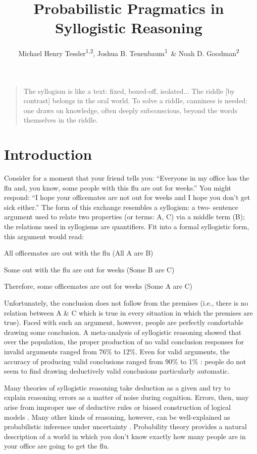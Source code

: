 \documentclass[floatsintext, man]{apa6}
\title{Probabilistic Pragmatics in Syllogistic Reasoning}
\author{Michael Henry Tessler\textsuperscript{1}\textsuperscript{,2}, Joshua B. Tenenbaum\textsuperscript{1}~\& Noah D. Goodman\textsuperscript{2}}
\date{}
\affiliation{
\vspace{0.5cm}
\textsuperscript{1} Department of Brain and Cognitive Sciences, Massachusetts Institute of Technology \\
\textsuperscript{2} Department of Psychology, Stanford University
}
\date{}
\newenvironment{aquote}[1]
{\savebox\mybox{#1}\begin{quote}} {\signed{\usebox\mybox}\end{quote}}
\begin{document}
\maketitle


\begin{aquote}{\textbf{Walter J. Ong}, \emph{Orality and Literacy} (1982)}The syllogism is like a text: fixed, boxed-off, isolated... The riddle [by contrast] belongs in the oral world. To solve a riddle, canniness is needed: one draws on knowledge, often deeply subconscious, beyond the words themselves in the riddle. \end{aquote}


\section{Introduction}


Consider for a moment that your friend tells you: “Everyone in my office has the flu and, you know, some people with this flu are out for weeks.” You might respond: “I hope your officemates are not out for weeks and I hope you don’t get sick either.” The form of this exchange resembles a syllogism: a two- sentence argument used to relate two properties (or terms: A, C) via a middle term (B); the relations used in syllogisms are quantifiers. Fit into a formal syllogistic form, this argument would read:

All officemates are out with the flu (All A are B)

Some out with the flu are out for weeks (Some B are C) 

Therefore, some officemates are out for weeks (Some A are C)

Unfortunately, the conclusion does not follow from the premises (i.e., there is no relation between A \& C which is true in every situation in which the premises are true). Faced with such an argument, however, people are perfectly comfortable drawing some conclusion. A meta-analysis of syllogistic reasoning showed that over the population, the proper production of no valid conclusion responses for invalid arguments ranged from 76\% to 12\%. Even for valid arguments, the accuracy of producing valid conclusions ranged from 90\% to 1\% \cite{Khemlani2012}: people do not seem to find drawing deductively valid conclusions particularly automatic.

Many theories of syllogistic reasoning take deduction as a given and try to explain reasoning errors as a matter of noise during cognition. 
Errors, then, may arise from improper use of deductive rules \cite{rips1994, geurts2003reasoning} or biased construction of logical models \cite{JL1984, Newstead1992}. 
Many other kinds of reasoning, however, can be well-explained as probabilistic inference under uncertainty \cite{tenenbaum2006theory}. 
Probability theory provides a natural description of a world in which you don’t know exactly how many people are in your office are going to get the flu.
\end{document}
